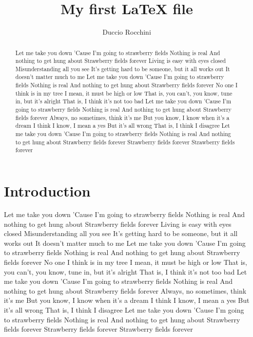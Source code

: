 \documentclass[12pt]{article}
\title{My first LaTeX file}
\author{Duccio Rocchini}
\begin{document}
\maketitle

\begin{abstract}
    Let me take you down
'Cause I'm going to strawberry fields
Nothing is real
And nothing to get hung about
Strawberry fields forever
Living is easy with eyes closed
Misunderstanding all you see
It's getting hard to be someone, but it all works out
It doesn't matter much to me
Let me take you down
'Cause I'm going to strawberry fields
Nothing is real
And nothing to get hung about
Strawberry fields forever
No one I think is in my tree
I mean, it must be high or low
That is, you can't, you know, tune in, but it's alright
That is, I think it's not too bad
Let me take you down
'Cause I'm going to strawberry fields
Nothing is real
And nothing to get hung about
Strawberry fields forever
Always, no sometimes, think it's me
But you know, I know when it's a dream
I think I know, I mean a yes
But it's all wrong
That is, I think I disagree
Let me take you down
'Cause I'm going to strawberry fields
Nothing is real
And nothing to get hung about
Strawberry fields forever
Strawberry fields forever
Strawberry fields forever 
\end{abstract}

\tableofcontents

\section{Introduction}
Let me take you down
'Cause I'm going to strawberry fields
Nothing is real
And nothing to get hung about
Strawberry fields forever
Living is easy with eyes closed
Misunderstanding all you see
It's getting hard to be someone, but it all works out
It doesn't matter much to me
Let me take you down
'Cause I'm going to strawberry fields
Nothing is real
And nothing to get hung about
Strawberry fields forever
No one I think is in my tree
I mean, it must be high or low
That is, you can't, you know, tune in, but it's alright
That is, I think it's not too bad
Let me take you down
'Cause I'm going to strawberry fields
Nothing is real
And nothing to get hung about
Strawberry fields forever
Always, no sometimes, think it's me
But you know, I know when it's a dream
I think I know, I mean a yes
But it's all wrong
That is, I think I disagree
Let me take you down
'Cause I'm going to strawberry fields
Nothing is real
And nothing to get hung about
Strawberry fields forever
Strawberry fields forever
Strawberry fields forever \cite{Anderson2013}
\end{document}
